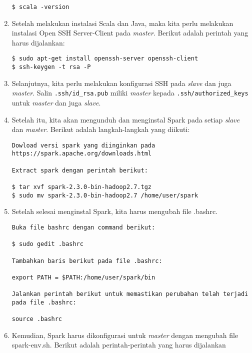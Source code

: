 \begin{enumerate}
\begin{verbatim}
$ scala -version
\end{verbatim}

\item Setelah melakukan instalasi Scala dan Java, maka kita perlu melakukan instalasi Open SSH Server-Client pada \textit{master}. Berikut adalah perintah yang harus dijalankan:

\begin{verbatim}
$ sudo apt-get install openssh-server openssh-client
$ ssh-keygen -t rsa -P 
\end{verbatim}

\item Selanjutnya, kita perlu melakukan konfigurasi SSH pada \textit{slave} dan juga \textit{master}. Salin \texttt{.ssh/id\_rsa.pub} miliki \textit{master} kepada \texttt{.ssh/authorized\_keys} untuk \textit{master} dan juga \textit{slave}.

\item Setelah itu, kita akan mengunduh dan menginstal Spark pada setiap \textit{slave} dan \textit{master}. Berikut adalah langkah-langkah yang diikuti:

\begin{verbatim}
Dowload versi spark yang diinginkan pada https://spark.apache.org/downloads.html

Extract spark dengan perintah berikut:

$ tar xvf spark-2.3.0-bin-hadoop2.7.tgz
$ sudo mv spark-2.3.0-bin-hadoop2.7 /home/user/spark
\end{verbatim}

\item Setelah selesai menginstal Spark, kita harus mengubah file .bashrc.

\begin{verbatim}
Buka file bashrc dengan command berikut:

$ sudo gedit .bashrc 

Tambahkan baris berikut pada file .bashrc:

export PATH = $PATH:/home/user/spark/bin

Jalankan perintah berikut untuk memastikan perubahan telah terjadi pada file .bashrc:

source .bashrc
\end{verbatim}

\item Kemudian, Spark harus dikonfigurasi untuk \textit{master} dengan mengubah file spark-env.sh. Berikut adalah perintah-perintah yang harus dijalankan


\end{enumerate}
